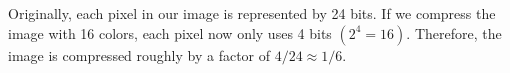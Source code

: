 \begin{answer}
Originally, each pixel in our image is represented by 24 bits. If we compress the image with 16 colors, each pixel now only uses 4 bits $(2^4 = 16)$. Therefore, the image is compressed roughly by a factor of $4/24 \approx 1/6$. \\
\end{answer}
